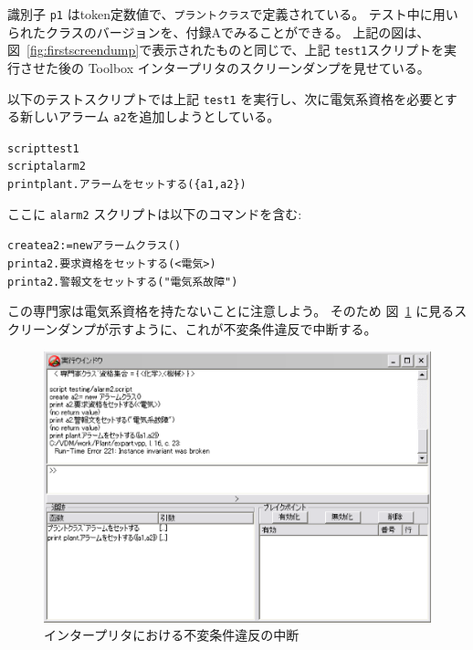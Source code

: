 \documentclass[\pformat,12pt,twoside]{jarticle}
\begin{document}
識別子 \texttt{p1} はtoken定数値で、\texttt{プラントクラス}で定義されている。
テスト中に用いられたクラスのバージョンを、付録Aでみることができる。
上記の図は、図~\ref{fig:firstscreendump}で表示されたものと同じで、上記  \texttt{test1}スクリプトを実行させた後の Toolbox インタープリタのスクリーンダンプを見せている。

以下のテストスクリプトでは上記 \texttt{test1} を実行し、次に電気系資格を必要とする新しいアラーム \texttt{a2}を追加しようとしている。

\small
\begin{alltt}
  script test1
  script alarm2
  print plant.アラームをセットする(\{a1,a2\})

\end{alltt}
\normalsize

ここに \texttt{alarm2} スクリプトは以下のコマンドを含む:

\small
\begin{alltt}
  create a2:= new アラームクラス()
  print a2.要求資格をセットする(\texttt{<}電気\texttt{>})
  print a2.警報文をセットする("電気系故障")

\end{alltt}
\normalsize

この専門家は電気系資格を持たないことに注意しよう。
そのため 図~\ref{fig:secondscreendump} に見るスクリーンダンプが示すように、これが不変条件違反で中断する。

\begin{figure}[htb]
\begin{center}
\includegraphics[width=5.546in]{secondscreendump}
\caption{インタープリタにおける不変条件違反の中断 \label{fig:secondscreendump}}
\end{center}
\end{figure}
\end{document}
